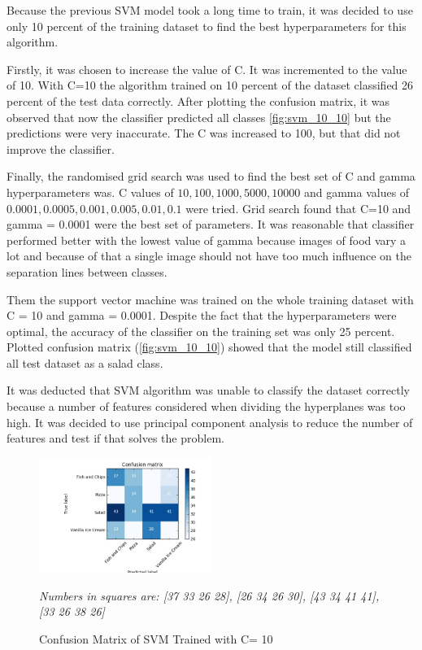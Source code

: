 Because the previous SVM model took a long time to train, it was decided to use only 10 percent of the training dataset to find the best hyperparameters for this algorithm.

Firstly, it was chosen to increase the value of C. It was incremented to the value of 10. With C=10 the algorithm trained on 10 percent of the dataset classified 26 percent of the test data correctly. After plotting the confusion matrix, it was observed that now the classifier predicted all classes \autoref{fig:svm_10_10} but the predictions were very inaccurate. The C was increased to 100, but that did not improve the classifier.

Finally, the  randomised grid search was used to find the  best set of C and gamma hyperparameters was. C values of  \(10, 100, 1000, 5000, 10000\) and gamma values  of \(0.0001, 0.0005, 0.001, 0.005, 0.01, 0.1\) were tried. Grid search found that C=10 and gamma = 0.0001 were the best set of parameters. It was reasonable that classifier performed better with the lowest value of gamma because images of food vary a lot and because of that a single image should not have too much influence on the separation lines between classes. 

Them  the support vector machine was trained on the whole training dataset with C = 10 and gamma = 0.0001. Despite the fact that the hyperparameters were optimal, the accuracy of the classifier on the training set was only 25 percent. Plotted confusion matrix (\autoref{fig:svm_10_10}) showed that the model still classified all test dataset as a salad class. 

It was deducted that SVM algorithm was unable to classify the dataset correctly because a number of features considered when dividing the hyperplanes was too high. It was decided to use principal component analysis to reduce the number of features and test if that solves the problem.


\begin{figure}[h]
\centering
\includegraphics[width=0.5\textwidth]{Figures/svm_10_10.jpg}
\caption{Confusion Matrix of SVM Trained with C= 10}
\medskip
 \textit{Numbers in squares are: [37 33 26 28],
 [26 34 26 30],
 [43 34 41 41],
 [33 26 38 26]}
\label{fig:svm_10_10}
\end{figure}

